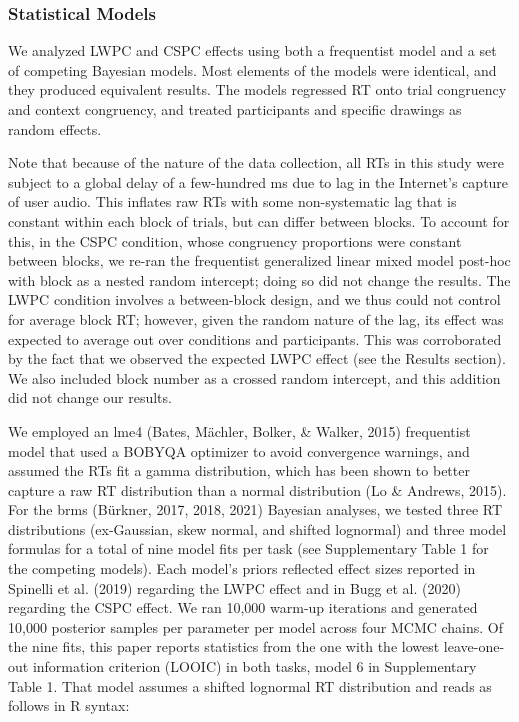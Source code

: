 \documentclass[
  ,man,floatsintext]{apa6}
\begin{document}
\hypertarget{statistical-models}{%
\subsubsection{Statistical Models}\label{statistical-models}}

We analyzed LWPC and CSPC effects using both a frequentist model and a set of competing Bayesian models. Most elements of the models were identical, and they produced equivalent results. The models regressed RT onto trial congruency and context congruency, and treated participants and specific drawings as random effects.

Note that because of the nature of the data collection, all RTs in this study were subject to a global delay of a few-hundred ms due to lag in the Internet's capture of user audio. This inflates raw RTs with some non-systematic lag that is constant within each block of trials, but can differ between blocks. To account for this, in the CSPC condition, whose congruency proportions were constant between blocks, we re-ran the frequentist generalized linear mixed model post-hoc with block as a nested random intercept; doing so did not change the results. The LWPC condition involves a between-block design, and we thus could not control for average block RT; however, given the random nature of the lag, its effect was expected to average out over conditions and participants. This was corroborated by the fact that we observed the expected LWPC effect (see the Results section). We also included block number as a crossed random intercept, and this addition did not change our results.

We employed an lme4 (Bates, Mächler, Bolker, \& Walker, 2015) frequentist model that used a BOBYQA optimizer to avoid convergence warnings, and assumed the RTs fit a gamma distribution, which has been shown to better capture a raw RT distribution than a normal distribution (Lo \& Andrews, 2015). For the brms (Bürkner, 2017, 2018, 2021) Bayesian analyses, we tested three RT distributions (ex-Gaussian, skew normal, and shifted lognormal) and three model formulas for a total of nine model fits per task (see Supplementary Table 1 for the competing models). Each model's priors reflected effect sizes reported in Spinelli et al. (2019) regarding the LWPC effect and in Bugg et al. (2020) regarding the CSPC effect. We ran 10,000 warm-up iterations and generated 10,000 posterior samples per parameter per model across four MCMC chains. Of the nine fits, this paper reports statistics from the one with the lowest leave-one-out information criterion (LOOIC) in both tasks, model 6 in Supplementary Table 1. That model assumes a shifted lognormal RT distribution and reads as follows in R syntax:
\end{document}

